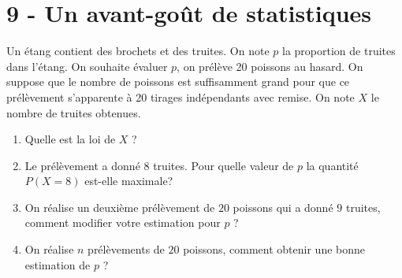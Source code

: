 \section*{9 - Un avant-goût de statistiques}
Un étang contient des brochets et des truites. On note $p$ la proportion de truites dans l'étang. On souhaite évaluer $p$, on prélève 20 poissons au hasard. On suppose que le nombre de poissons est suffisamment grand pour que ce prélèvement s'apparente à 20 tirages indépendants avec remise. 
On note $X$ le nombre de truites obtenues.
\begin{enumerate}
\item Quelle est la loi de $X$ ?
\item Le prélèvement a donné 8 truites. Pour quelle valeur de $p$ la quantité $P(X=8)$ est-elle maximale?
\item On réalise un deuxième prélèvement de $20$ poissons qui a donné $9$ truites, comment modifier votre estimation pour $p$ ?
\item On réalise $n$ prélèvements de $20$ poissons, comment obtenir une bonne estimation de $p$ ?
\end{enumerate}
\vspace{2em}


